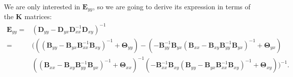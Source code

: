 We are only interested in $\mathbf{E}_{yy}$, so we are going to derive its expression in terms of the $\mathbf{K}$ matrices:
\begin{align}
\mathbf{E}_{yy}  = & (\mathbf{D}_{yy}-\mathbf{D}_{yx}\mathbf{D}_{xx}^{-1}\mathbf{D}_{xy})^{-1} \nonumber \\
                 = & (((\mathbf{B}_{yy}-\mathbf{B}_{yx}\mathbf{B}_{xx}^{-1}\mathbf{B}_{xy})^{-1} + \mathbf{\Theta}_{yy})-(-\mathbf{B}_{yy}^{-1}\mathbf{B}_{yx}(\mathbf{B}_{xx}-\mathbf{B}_{xy}\mathbf{B}_{yy}^{-1}\mathbf{B}_{yx})^{-1} + \mathbf{\Theta}_{yx}) \nonumber \\ & ((\mathbf{B}_{xx}-\mathbf{B}_{xy}\mathbf{B}_{yy}^{-1}\mathbf{B}_{yx})^{-1} + \mathbf{\Theta}_{xx})^{-1}(-\mathbf{B}_{xx}^{-1}\mathbf{B}_{xy}(\mathbf{B}_{yy}-\mathbf{B}_{yx}\mathbf{B}_{xx}^{-1}\mathbf{B}_{xy})^{-1} + \mathbf{\Theta}_{xy}))^{-1}.
\label{eq:ep_approx}
\end{align}

